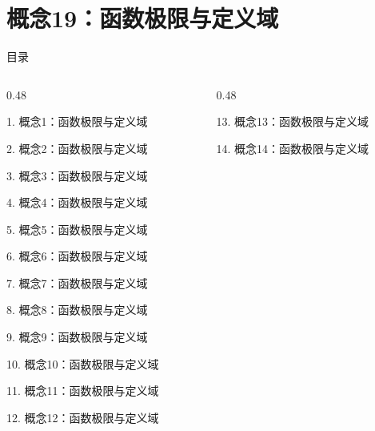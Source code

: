 \documentclass[aspectratio=169,10pt,fontset=fandol]{ctexbeamer}
\begin{document}
\section{概念19：函数极限与定义域}
\begin{frame}[t,fragile]{目录}
\small
\begin{columns}[T,onlytextwidth]
\begin{column}{0.48\textwidth}
{\color{black}\small 1. 概念1：函数极限与定义域\par}\vspace{0.22em}
{\color{black}\small 2. 概念2：函数极限与定义域\par}\vspace{0.22em}
{\color{black}\small 3. 概念3：函数极限与定义域\par}\vspace{0.22em}
{\color{black}\small 4. 概念4：函数极限与定义域\par}\vspace{0.22em}
{\color{black}\small 5. 概念5：函数极限与定义域\par}\vspace{0.22em}
{\color{black}\small 6. 概念6：函数极限与定义域\par}\vspace{0.22em}
{\color{black}\small 7. 概念7：函数极限与定义域\par}\vspace{0.22em}
{\color{black}\small 8. 概念8：函数极限与定义域\par}\vspace{0.22em}
{\color{black}\small 9. 概念9：函数极限与定义域\par}\vspace{0.22em}
{\color{black}\small 10. 概念10：函数极限与定义域\par}\vspace{0.22em}
{\color{black}\small 11. 概念11：函数极限与定义域\par}\vspace{0.22em}
{\color{black}\small 12. 概念12：函数极限与定义域\par}\vspace{0.22em}
\end{column}
\begin{column}{0.48\textwidth}
{\color{black}\small 13. 概念13：函数极限与定义域\par}\vspace{0.22em}
{\color{black}\small 14. 概念14：函数极限与定义域\par}\vspace{0.22em}

\end{column}
\end{columns}
\end{frame}
\end{document}
